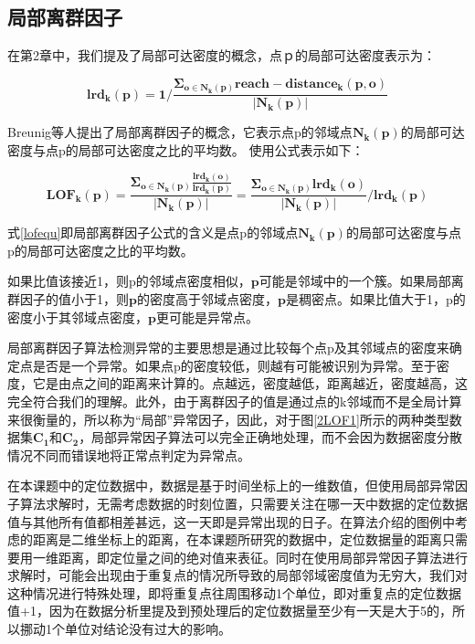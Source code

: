 \documentclass[a4paper,AutoFakeBold,oneside,12pt]{book}
\begin{document}
\subsection{局部离群因子}

	在第2章中，我们提及了局部可达密度的概念，点ｐ的局部可达密度表示为：

	\begin{equation}
	\label{lrdequ}
	\bm{lrd_k(p)}=\bm{1}/\frac{\bm{\Sigma_{o\in N_k(p)} reach-distance_k(p,o)}}{\bm{|N_k(p)|}}
	\end{equation}

	Breunig等人提出了局部离群因子的概念\cite{breunig2000lof}，它表示点p的邻域点$\bm{N_k(p)}$的局部可达密度与点p的局部可达密度之比的平均数。 使用公式表示如下：

	\begin{equation}
	\label{lofequ}
	\bm{LOF_k(p)}=\frac{\bm{\Sigma_{o\in N_k(p)} \frac{lrd_k(o)}{lrd_k(p)}}}{\bm{|N_k(p)|}}=\frac{\bm{\Sigma_{o\in N_k(p)} lrd_k(o)}}{\bm{|N_k(p)|}}/\bm{lrd_k(p)}
	\end{equation}

	式\ref{lofequ}即局部离群因子公式的含义是点p的邻域点$\bm{N_k(p)}$的局部可达密度与点p的局部可达密度之比的平均数。

	如果比值该接近1，则p的邻域点密度相似，$\bm{p}$可能是邻域中的一个簇。如果局部离群因子的值小于1，则$\bm{p}$的密度高于邻域点密度，$\bm{p}$是稠密点。如果比值大于1，p的密度小于其邻域点密度，$\bm{p}$更可能是异常点。

	局部离群因子算法检测异常的主要思想是通过比较每个点p及其邻域点的密度来确定点是否是一个异常。如果点p的密度较低，则越有可能被识别为异常。至于密度，它是由点之间的距离来计算的。点越远，密度越低，距离越近，密度越高，这完全符合我们的理解。此外，由于离群因子的值是通过点的k邻域而不是全局计算来很衡量的，所以称为“局部”异常因子，因此，对于图\ref{2LOF1}所示的两种类型数据集$\bm{C_1}$和$\bm{C_2}$，局部异常因子算法可以完全正确地处理，而不会因为数据密度分散情况不同而错误地将正常点判定为异常点。

	在本课题中的定位数据中，数据是基于时间坐标上的一维数值，但使用局部异常因子算法求解时，无需考虑数据的时刻位置，只需要关注在哪一天中数据的定位数据值与其他所有值都相差甚远，这一天即是异常出现的日子。在算法介绍的图例中考虑的距离是二维坐标上的距离，在本课题所研究的数据中，定位数据量的距离只需要用一维距离，即定位量之间的绝对值来表征。同时在使用局部异常因子算法进行求解时，可能会出现由于重复点的情况所导致的局部邻域密度值为无穷大，我们对这种情况进行特殊处理，即将重复点往周围移动1个单位，即对重复点的定位数据值+1，因为在数据分析里提及到预处理后的定位数据量至少有一天是大于5的，所以挪动1个单位对结论没有过大的影响。
\end{document}
